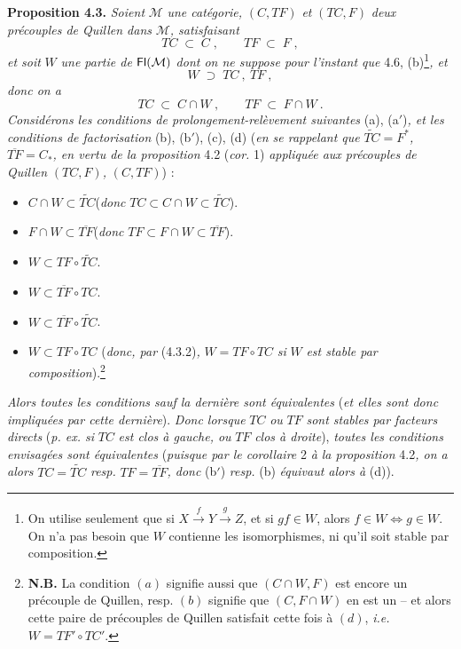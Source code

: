 \textbf{Proposition 4.3.} \textit{Soient} $\mathcal{M}$ \textit{une catégorie,} $(C,TF)$ \textit{et} $(TC,F)$ \textit{deux précouples de Quillen dans} $\mathcal{M}$\textit{, satisfaisant}
\[
TC \;\subset\; C\;, \qquad TF \;\subset\; F\;,
\tag*{(4.3.1)}
\]
\textit{et soit} $W$ \textit{une partie de} $\mathsf{Fl}(\mathcal{M})$ \textit{dont on ne suppose pour l'instant que} 4.6, (b)\footnote[10]{On utilise seulement que si $X\xrightarrow{\;f\;}Y\xrightarrow{\;g\;}Z$, et si $gf\in W$, alors $f\in W\Longleftrightarrow g\in W$. On n'a pas besoin que $W$ contienne les isomorphismes, ni qu'il soit stable par composition.}\textit{, et} %
\[
W \;\supset\; TC\ ,\ TF\ ,
\tag*{(4.3.2)}
\]
\textit{donc on a}
\[
TC \;\subset\; C\cap W\ , \qquad TF \;\subset\; F\cap W\ .
\tag*{(4.3.3)}
\]
\textit{Considérons les conditions de prolongement-relèvement suivantes} (a), (a$'$)\textit{, et les conditions de factorisation} (b), (b$'$), (c), (d) (\textit{en se rappelant que} $\widetilde{TC}=F^*$\textit{,} $\overline{TF}=C_*$\textit{, en vertu de la proposition} 4.2 (\textit{cor.} 1) \textit{appliquée aux précouples de Quillen} $(TC,F)$\textit{,} $(C,TF)$) :
\begin{itemize}[leftmargin=2.5em]
\item[a)] $C\cap W\subset\widetilde{TC}$\quad (\textit{donc} $TC\subset C\cap W\subset\widetilde{TC}$).
\item[a$'$)] $F\cap W\subset\overline{TF}$\quad (\textit{donc} $TF\subset F\cap W\subset\overline{TF}$).
\item[b)] $W\subset TF\circ\widetilde{TC}$.
\item[b$'$)] $W\subset\overline{TF}\circ TC$.
\item[c)] $W\subset\overline{TF}\circ\widetilde{TC}$.
\item[d)] $W\subset TF{\circ}TC$ (\textit{donc, par} (4.3.2)\textit{,} $W=TF{\circ}TC$ \textit{si} $W$ \textit{est stable par composition}).\footnote[11]{\textbf{N.B.} La condition $(a)$ signifie aussi que $(C\cap W,F)$ est encore un précouple de Quillen, resp. $(b)$ signifie que $(C,F\cap W)$ en est un -- et alors cette paire de précouples de Quillen satisfait cette fois à $(d)$, \textit{i.e.} $W=TF'\circ TC'$.} %
\end{itemize}

\textit{Alors toutes les conditions sauf la dernière sont équivalentes} (\textit{et elles sont donc impliquées par cette dernière}). \textit{Donc lorsque} $TC$ \textit{ou} $TF$ \textit{sont stables par facteurs directs} (\textit{p. ex. si} $TC$ \textit{est clos à gauche, ou} $TF$ \textit{clos à droite}), \textit{toutes les conditions envisagées sont équivalentes} (\textit{puisque par le corollaire} 2 \textit{à la proposition} 4.2\textit{, on a alors} $TC=\widetilde{TC}$ \textit{resp.} $TF=\overline{TF}$\textit{, donc} (b$'$) \textit{resp.} (b) \textit{équivaut alors à} (d)).


